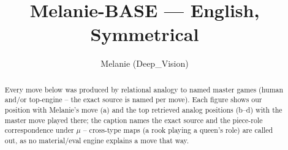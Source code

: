 \documentclass[11pt]{article}
\title{Melanie-BASE — English, Symmetrical}
\author{Melanie (Deep\_Vision)}
\date{}
\begin{document}
\maketitle

\begin{abstract}Every move below was produced by relational analogy to named master games (human and/or top-engine -- the exact source is named per move). Each figure shows our position with Melanie's move (a) and the top retrieved analog positions (b--d) with the master move played there; the caption names the exact source and the piece-role correspondence under $\mu$ -- cross-type maps (a rook playing a queen's role) are called out, as no material/eval engine explains a move that way.\end{abstract}

\begin{figure}[p]\centering
\begin{subfigure}{0.46\textwidth}\centering
\resizebox{\linewidth}{!}{%
\newchessgame
\chessboard[
  setfen={r1bq1rk1/pp1pppbp/2n2np1/2p5/2P5/2N2NP1/PP1PPPBP/R1BQ1RK1 w - - 4 7},
  showmover=false,
  pgfstyle=straightmove, color=movearrow, markmove={h2-h4}
]}
\caption{}
\end{subfigure}\hfill
\begin{subfigure}{0.46\textwidth}\centering
\resizebox{\linewidth}{!}{%
\newchessgame
\chessboard[
  setfen={r1bqk2r/pp1pppbp/2n2np1/2p5/8/2NP1NP1/PPP1PPBP/R1BQ1RK1 b kq - 2 6},
  showmover=false,
  pgfstyle=straightmove, color=movearrow, markmove={d7-d5}
]}
\caption{}
\end{subfigure}
\\[4pt]
\begin{subfigure}{0.46\textwidth}\centering
\resizebox{\linewidth}{!}{%
\newchessgame
\chessboard[
  setfen={r1bqk2r/pp1pppbp/2n2np1/2p5/8/2NP1NP1/PPP1PPBP/R1BQ1RK1 b kq - 2 6},
  showmover=false,
  pgfstyle=straightmove, color=movearrow, markmove={d7-d5}
]}
\caption{}
\end{subfigure}\hfill
\begin{subfigure}{0.46\textwidth}\centering
\resizebox{\linewidth}{!}{%
\newchessgame
\chessboard[
  setfen={r1bqk2r/pp1pppbp/2n2np1/2p5/8/2NP1NP1/PPP1PPBP/R1BQ1RK1 b kq - 2 6},
  showmover=false,
  pgfstyle=straightmove, color=movearrow, markmove={d7-d5}
]}
\caption{}
\end{subfigure}

\end{figure}
\end{document}
